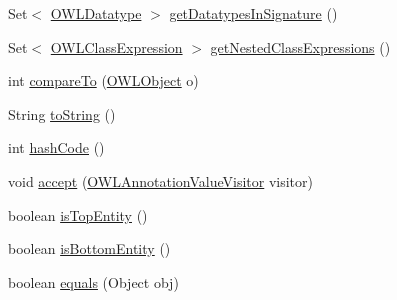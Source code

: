 \begin{DoxyCompactItemize}
\item 
Set$<$ \hyperlink{interfaceorg_1_1semanticweb_1_1owlapi_1_1model_1_1_o_w_l_datatype}{O\-W\-L\-Datatype} $>$ \hyperlink{classorg_1_1semanticweb_1_1owlapi_1_1model_1_1_i_r_i_a28b303b47529fe7a8fb9500063f996d2}{get\-Datatypes\-In\-Signature} ()
\item 
Set$<$ \hyperlink{interfaceorg_1_1semanticweb_1_1owlapi_1_1model_1_1_o_w_l_class_expression}{O\-W\-L\-Class\-Expression} $>$ \hyperlink{classorg_1_1semanticweb_1_1owlapi_1_1model_1_1_i_r_i_a3dc6e423b4d1b57c1fa049e74402d724}{get\-Nested\-Class\-Expressions} ()
\item 
int \hyperlink{classorg_1_1semanticweb_1_1owlapi_1_1model_1_1_i_r_i_a411cfe723f5efaf0d46ba331a71be72d}{compare\-To} (\hyperlink{interfaceorg_1_1semanticweb_1_1owlapi_1_1model_1_1_o_w_l_object}{O\-W\-L\-Object} o)
\item 
String \hyperlink{classorg_1_1semanticweb_1_1owlapi_1_1model_1_1_i_r_i_aa2384590bffa66be3b4d6ab714b6868f}{to\-String} ()
\item 
int \hyperlink{classorg_1_1semanticweb_1_1owlapi_1_1model_1_1_i_r_i_af58d22d3489e87cf22bdc11422f917be}{hash\-Code} ()
\item 
void \hyperlink{classorg_1_1semanticweb_1_1owlapi_1_1model_1_1_i_r_i_a9b595acb0e285ec2904d5bbda69ef2ee}{accept} (\hyperlink{interfaceorg_1_1semanticweb_1_1owlapi_1_1model_1_1_o_w_l_annotation_value_visitor}{O\-W\-L\-Annotation\-Value\-Visitor} visitor)
\item 
boolean \hyperlink{classorg_1_1semanticweb_1_1owlapi_1_1model_1_1_i_r_i_ad1d5541605d3c911236fc2eb575b729c}{is\-Top\-Entity} ()
\item 
boolean \hyperlink{classorg_1_1semanticweb_1_1owlapi_1_1model_1_1_i_r_i_ac9dcd6b65c9d7ed1b49867d2cd0be27f}{is\-Bottom\-Entity} ()
\item 
boolean \hyperlink{classorg_1_1semanticweb_1_1owlapi_1_1model_1_1_i_r_i_a2836257932774ea9d462e6aa18a8c711}{equals} (Object obj)
\end{DoxyCompactItemize}
